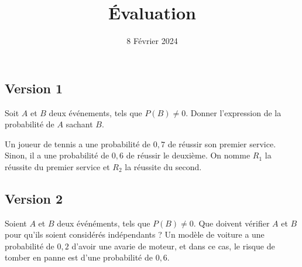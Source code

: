 \documentclass{exam}
\title{\'Evaluation}
\date{8 Février 2024}
\author{}
\begin{document}
\maketitle
\subsection*{Version 1}
\begin{questions}
\question Soit $A$ et $B$ deux événements, tels que $P(B) \neq 0$. Donner l'expression de la probabilité de $A$ sachant $B$.

\question Un joueur de tennis a une probabilité de $0,7$ de réussir son premier service. Sinon, il a une probabilité de $0,6$ de réussir le deuxième. On nomme $R_1$ la réussite du premier service et $R_2$ la réussite du second.
\end{questions}
\newpage
\maketitle
\subsection*{Version 2}
\begin{questions}
\question Soient $A$ et $B$ deux événéments, tels que $P(B) \neq 0$. Que doivent vérifier $A$ et $B$ pour qu'ils soient considérés indépendants ?
\question Un modèle de voiture a une probabilité de $0,2$ d'avoir une avarie de moteur, et dans ce cas, le risque de tomber en panne est d'une probabilité de $0,6$.
\end{questions}
\end{document}
